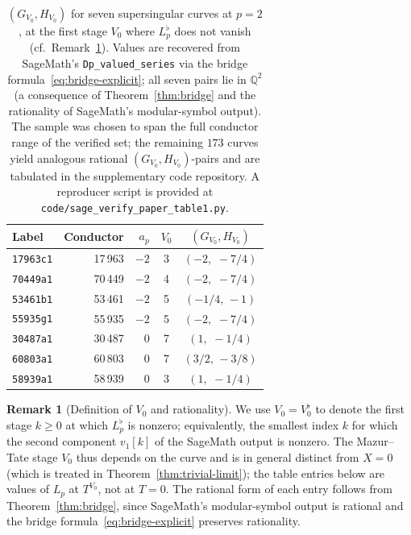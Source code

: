 \documentclass[11pt,a4paper]{amsart}
\theoremstyle{definition}
\newtheorem{remark}[theorem]{Remark}
\newcommand{\Q}{\mathbb{Q}}
\begin{document}
\begin{table}[h]
\centering
\begin{tabular}{l|r|r|c|c}
Label & Conductor & $a_p$ & $V_0$ & $(G_{V_0}, H_{V_0})$ \\
\hline
\texttt{17963c1}  & 17\,963  & $-2$ & 3 & $(-2,\,\, -7/4)$ \\
\texttt{70449a1}  & 70\,449  & $-2$ & 4 & $(-2,\,\, -7/4)$ \\
\texttt{53461b1}  & 53\,461  & $-2$ & 5 & $(-1/4,\, -1)$ \\
\texttt{55935g1}  & 55\,935  & $-2$ & 5 & $(-2,\,\, -7/4)$ \\
\hline
\texttt{30487a1}  & 30\,487  & $0$  & 7 & $(1,\,\, -1/4)$ \\
\texttt{60803a1}  & 60\,803  & $0$  & 7 & $(3/2,\, -3/8)$ \\
\texttt{58939a1}  & 58\,939  & $0$  & 3 & $(1,\,\, -1/4)$ \\
\hline
\end{tabular}
\caption{$(G_{V_0}, H_{V_0})$ for seven supersingular curves at $p = 2$, at the first stage $V_0$ where $L_p^\flat$ does not vanish (cf.\ Remark~\ref{rem:V0-def}). Values are recovered from SageMath's \texttt{Dp\_valued\_series} via the bridge formula~\eqref{eq:bridge-explicit}; all seven pairs lie in $\Q^2$ (a consequence of Theorem~\ref{thm:bridge} and the rationality of SageMath's modular-symbol output). The sample was chosen to span the full conductor range of the verified set; the remaining $173$ curves yield analogous rational $(G_{V_0}, H_{V_0})$-pairs and are tabulated in the supplementary code repository. A reproducer script is provided at \texttt{code/sage\_verify\_paper\_table1.py}.}
\label{tab:sample}
\end{table}

\begin{remark}[Definition of $V_0$ and rationality]\label{rem:V0-def}
We use $V_0 = V_0^\flat$ to denote the first stage $k \geq 0$ at which $L_p^\flat$ is nonzero; equivalently, the smallest index $k$ for which the second component $v_1[k]$ of the SageMath output is nonzero. The Mazur--Tate stage $V_0$ thus depends on the curve and is in general distinct from $X = 0$ (which is treated in Theorem~\ref{thm:trivial-limit}); the table entries below are values of $L_p$ at $T^{V_0}$, not at $T = 0$. The rational form of each entry follows from Theorem~\ref{thm:bridge}, since SageMath's modular-symbol output is rational and the bridge formula~\eqref{eq:bridge-explicit} preserves rationality.
\end{remark}
\end{document}
